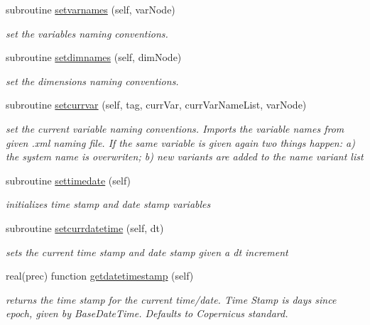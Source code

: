 \begin{DoxyCompactItemize}
subroutine \mbox{\hyperlink{namespacesimulationglobals__mod_a2c6fa0a9123d06b2110258ea200f4f52}{setvarnames}} (self, var\+Node)
\begin{DoxyCompactList}\small\item\em set the variables naming conventions. \end{DoxyCompactList}\item 
subroutine \mbox{\hyperlink{namespacesimulationglobals__mod_a878fdcfa67037a1bc8411995394c2bef}{setdimnames}} (self, dim\+Node)
\begin{DoxyCompactList}\small\item\em set the dimensions naming conventions. \end{DoxyCompactList}\item 
subroutine \mbox{\hyperlink{namespacesimulationglobals__mod_a4dd64cb7a896b62d90e20a7eab65a6bf}{setcurrvar}} (self, tag, curr\+Var, curr\+Var\+Name\+List, var\+Node)
\begin{DoxyCompactList}\small\item\em set the current variable naming conventions. Imports the variable names from given .xml naming file. If the same variable is given again two things happen\+: a) the system name is overwriten; b) new variants are added to the name variant list \end{DoxyCompactList}\item 
subroutine \mbox{\hyperlink{namespacesimulationglobals__mod_aefda4344f03a705055ad6cb97cb90c65}{settimedate}} (self)
\begin{DoxyCompactList}\small\item\em initializes time stamp and date stamp variables \end{DoxyCompactList}\item 
subroutine \mbox{\hyperlink{namespacesimulationglobals__mod_acbb28eee5547a03dc28c924d8e23ad9a}{setcurrdatetime}} (self, dt)
\begin{DoxyCompactList}\small\item\em sets the current time stamp and date stamp given a dt increment \end{DoxyCompactList}\item 
real(prec) function \mbox{\hyperlink{namespacesimulationglobals__mod_a1fd33b50ae2216b3b7db074da1672398}{getdatetimestamp}} (self)
\begin{DoxyCompactList}\small\item\em returns the time stamp for the current time/date. Time Stamp is days since epoch, given by Base\+Date\+Time. Defaults to Copernicus standard. \end{DoxyCompactList}\item 

\end{DoxyCompactItemize}
